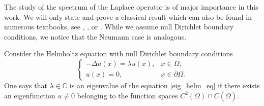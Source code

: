 The study of the spectrum of the Laplace operator is of major importance in this work. We will only state and prove a classical result which can also be found in numerous textbooks, see \cite{brezis2011functional}, \cite{arendt2010partielle}, \cite{courant2008methods} or \cite{borthwick2020spectral}. While we assume null Dirichlet boundary conditions, we notice that the Neumann case is analogous.

\begin{definition}\label{eig_def}
    Consider the Helmholtz equation with null Dirichlet boundary conditions
    \begin{equation}\label{eig_helm_eq}
        \begin{cases}
            -\Delta u(x) = \lambda u(x), & x \in \Omega, \\
            u(x) = 0, & x \in \partial \Omega.
        \end{cases}
    \end{equation}
    One says that \(\lambda \in \mathbb{C}\) is an eigenvalue of the equation \eqref{eig_helm_eq} if there exists an eigenfunction \(u \neq 0\) belonging to the function spaces \(C^2(\Omega) \cap C(\overline{\Omega})\).
\end{definition}

